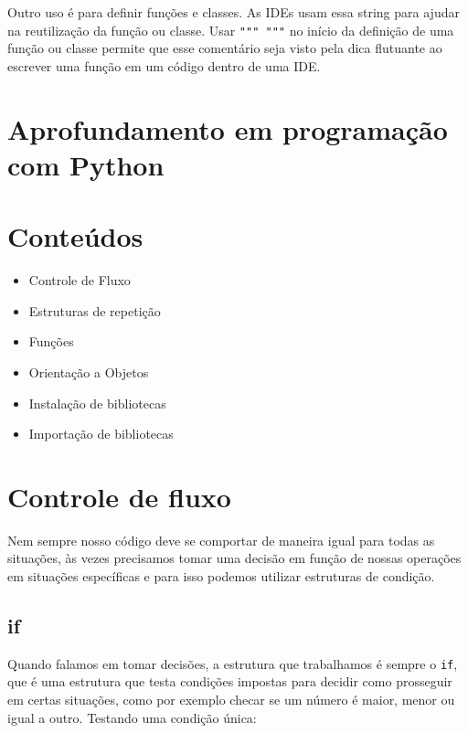 \documentclass[
  letterpaper,
  DIV=11,
  numbers=noendperiod]{scrreprt}
\providecommand{\tightlist}{%
  \setlength{\itemsep}{0pt}\setlength{\parskip}{0pt}}\usepackage{longtable,booktabs,array}
\begin{document}
Outro uso é para definir funções e classes. As IDEs usam essa string
para ajudar na reutilização da função ou classe. Usar \texttt{"""\ """}
no início da definição de uma função ou classe permite que esse
comentário seja visto pela dica flutuante ao escrever uma função em um
código dentro de uma IDE.


\hypertarget{aprofundamento-em-programauxe7uxe3o-com-python}{%
\chapter{Aprofundamento em programação com
Python}\label{aprofundamento-em-programauxe7uxe3o-com-python}}


\hypertarget{conteuxfados-1}{%
\chapter{Conteúdos}\label{conteuxfados-1}}

\begin{itemize}
\tightlist
\item
  Controle de Fluxo
\item
  Estruturas de repetição
\item
  Funções
\item
  Orientação a Objetos
\item
  Instalação de bibliotecas
\item
  Importação de bibliotecas
\end{itemize}


\hypertarget{controle-de-fluxo}{%
\chapter{Controle de fluxo}\label{controle-de-fluxo}}

Nem sempre nosso código deve se comportar de maneira igual para todas as
situações, às vezes precisamos tomar uma decisão em função de nossas
operações em situações específicas e para isso podemos utilizar
estruturas de condição.

\hypertarget{if}{%
\section{if}\label{if}}

Quando falamos em tomar decisões, a estrutura que trabalhamos é sempre o
\texttt{if}, que é uma estrutura que testa condições impostas para
decidir como prosseguir em certas situações, como por exemplo checar se
um número é maior, menor ou igual a outro. Testando uma condição única:
\end{document}
